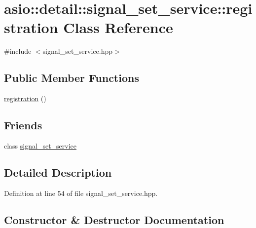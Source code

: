 \hypertarget{classasio_1_1detail_1_1signal__set__service_1_1registration}{}\section{asio\+:\+:detail\+:\+:signal\+\_\+set\+\_\+service\+:\+:registration Class Reference}
\label{classasio_1_1detail_1_1signal__set__service_1_1registration}


{\ttfamily \#include $<$signal\+\_\+set\+\_\+service.\+hpp$>$}

\subsection*{Public Member Functions}
\begin{DoxyCompactItemize}
\item 
\hyperlink{classasio_1_1detail_1_1signal__set__service_1_1registration_a65c2ce3d5492faca9aa77186b245768a}{registration} ()
\end{DoxyCompactItemize}
\subsection*{Friends}
\begin{DoxyCompactItemize}
\item 
class \hyperlink{classasio_1_1detail_1_1signal__set__service_1_1registration_a4c3a636c56d1c7da28cabb117a52300b}{signal\+\_\+set\+\_\+service}
\end{DoxyCompactItemize}


\subsection{Detailed Description}


Definition at line 54 of file signal\+\_\+set\+\_\+service.\+hpp.



\subsection{Constructor \& Destructor Documentation}
\hypertarget{classasio_1_1detail_1_1signal__set__service_1_1registration_a65c2ce3d5492faca9aa77186b245768a}{}
